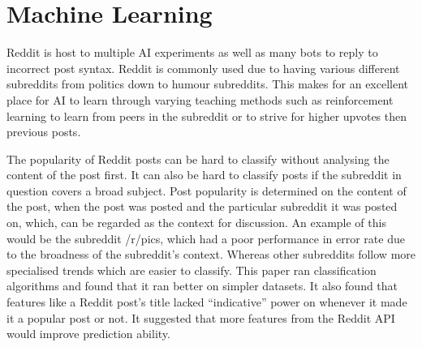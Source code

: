 \section{Machine Learning}
Reddit is host to multiple AI experiments as well as many bots to reply to incorrect post syntax. Reddit is commonly used due to having various different subreddits from politics down to humour subreddits. This makes for an excellent place for AI to learn through varying teaching methods such as reinforcement learning to learn from peers in the subreddit or to strive for higher upvotes then previous posts. \cite{2}
	
The popularity of Reddit posts can be hard to classify without analysing the content of the post first. It can also be hard to classify posts if the subreddit in question covers a broad subject. Post popularity is determined on the content of the post, when the post was posted and the particular subreddit it was posted on, which, can be regarded as the context for discussion. An example of this would be the subreddit /r/pics, which had a poor performance in error rate due to the broadness of the subreddit’s context. Whereas other subreddits follow more specialised trends which are easier to classify. This paper ran classification algorithms and found that it ran better on simpler datasets. It also found that features like a Reddit post’s title lacked “indicative” power on whenever it made it a popular post or not. It suggested that more features from the Reddit API would improve prediction ability. \cite{6}

